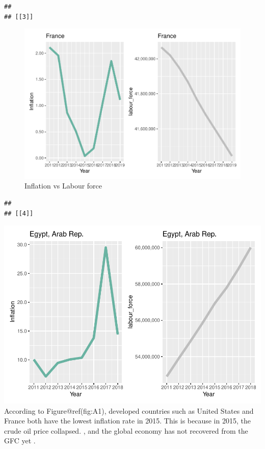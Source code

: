 \documentclass[
]{article}
\begin{document}
\begin{verbatim}
## 
## [[3]]
\end{verbatim}

\begin{figure}
\centering
\includegraphics{The_Outsiders_5513_files/figure-latex/A1-3.pdf}
\caption{Inflation vs Labour force}
\end{figure}

\begin{verbatim}
## 
## [[4]]
\end{verbatim}

\includegraphics{The_Outsiders_5513_files/figure-latex/A1-4.pdf}
According to Figure@ref(fig:A1), developed countries such as United
States and France both have the lowest inflation rate in 2015. This is
because in 2015, the crude oil price collapsed. \autocite{stocker}, and
the global economy has not recovered from the GFC yet
\autocite{inflation1}.
\end{document}
